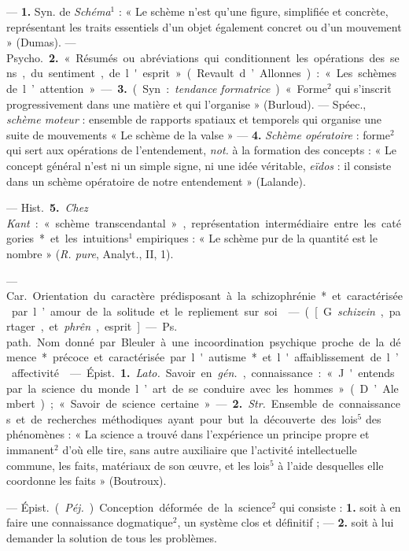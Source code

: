 \begin{itemize}[leftmargin=1cm, label=, itemsep=1pt]
 — {\bf 1.} Syn. de {\it Schéma}$^1$ : « Le schème n’est qu’une
figure, simplifiée et concrète, représentant les traits essentiels d’un objet
également concret ou d’un mouvement » (Dumas). — \si{Psycho.} {\bf 2.}
« Résumés ou abréviations qui conditionnent les opérations des sens, du
sentiment, de l'esprit » (Revault d’Allonnes) : « Les schèmes de
l’attention ». — {\bf 3.} (Syn. : {\it tendance formatrice}). « Forme$^2$
qui s’inscrit progressivement dans une matière et qui l’organise »
(Burloud). — Spéec., {\it schème moteur} : ensemble de rapports spatiaux et
temporels qui organise une suite de mouvements « Le schème de la valse » —
{\bf 4.} {\it Schème opératoire} : forme$^2$ qui sert aux opérations de
l’entendement, {\it not.} à la formation des concepts : « Le concept général
n’est ni un simple signe, ni une idée véritable,
{\it eïdos} : il consiste dans un schème opératoire de notre
entendement » (Lalande).

— \si{Hist.} {\bf 5.} {\it Chez Kant} : « schème transcendantal »,
représentation intermédiaire entre les catégories* et les intuitions$^1$
empiriques : « Le schème pur de la quantité est le nombre » ({\it R. pure},
Analyt., II, 1).

 — \si{Car.} Orientation du caractère prédisposant à la schizophrénie* et caractérisée par l’amour de la solitude et le repliement sur soi.

 — ([G. {\it schizein}, partager, et {\it phrên},
esprit] — \si{Ps. path.} Nom donné par Bleuler à une incoordination
psychique proche de la démence* précoce et caractérisée par l'autisme* et
l'affaiblissement de l’affectivité.

 — \si{Épist.} {\bf 1.} {\it Lato.} Savoir en {\it gén.},
connaissance : « J'entends par la science du monde l’art de se conduire avec
les hommes » (D’Alembert) ; « Savoir de science certaine... ». — {\bf 2.}
{\it Str.} Ensemble de connaissances et de recherches méthodiques ayant pour
but la découverte des lois$^5$ des phénomènes : « La science a trouvé dans
l’expérience un principe propre et immanent$^2$ d’où elle tire, sans autre
auxiliaire que l'activité intellectuelle commune, les faits, matériaux de son
œuvre, et les lois$^5$ à l'aide desquelles elle coordonne les
faits » (Boutroux).

 — \si{Épist.} ({\it Péj.}) Conception déformée de la
science$^2$ qui consiste : {\bf 1.} soit à en faire une connaissance
dogmatique$^2$, un système clos et définitif ; — {\bf 2.} soit à lui
demander la solution de tous les problèmes.


\end{itemize}
